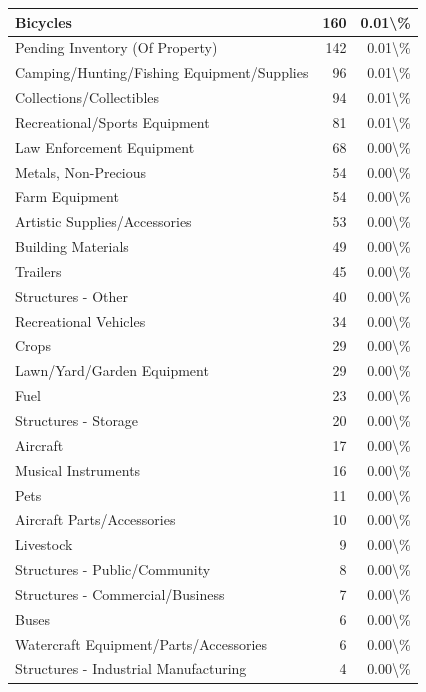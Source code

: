 \documentclass[
]{krantz}
\begin{document}
\begin{longtable}[t]{l|r|r}
\hline
Bicycles & 160 & 0.01\textbackslash{}\%\\
\hline
Pending Inventory (Of Property) & 142 & 0.01\textbackslash{}\%\\
\hline
Camping/Hunting/Fishing Equipment/Supplies & 96 & 0.01\textbackslash{}\%\\
\hline
Collections/Collectibles & 94 & 0.01\textbackslash{}\%\\
\hline
Recreational/Sports Equipment & 81 & 0.01\textbackslash{}\%\\
\hline
Law Enforcement Equipment & 68 & 0.00\textbackslash{}\%\\
\hline
Metals, Non-Precious & 54 & 0.00\textbackslash{}\%\\
\hline
Farm Equipment & 54 & 0.00\textbackslash{}\%\\
\hline
Artistic Supplies/Accessories & 53 & 0.00\textbackslash{}\%\\
\hline
Building Materials & 49 & 0.00\textbackslash{}\%\\
\hline
Trailers & 45 & 0.00\textbackslash{}\%\\
\hline
Structures - Other & 40 & 0.00\textbackslash{}\%\\
\hline
Recreational Vehicles & 34 & 0.00\textbackslash{}\%\\
\hline
Crops & 29 & 0.00\textbackslash{}\%\\
\hline
Lawn/Yard/Garden Equipment & 29 & 0.00\textbackslash{}\%\\
\hline
Fuel & 23 & 0.00\textbackslash{}\%\\
\hline
Structures - Storage & 20 & 0.00\textbackslash{}\%\\
\hline
Aircraft & 17 & 0.00\textbackslash{}\%\\
\hline
Musical Instruments & 16 & 0.00\textbackslash{}\%\\
\hline
Pets & 11 & 0.00\textbackslash{}\%\\
\hline
Aircraft Parts/Accessories & 10 & 0.00\textbackslash{}\%\\
\hline
Livestock & 9 & 0.00\textbackslash{}\%\\
\hline
Structures - Public/Community & 8 & 0.00\textbackslash{}\%\\
\hline
Structures - Commercial/Business & 7 & 0.00\textbackslash{}\%\\
\hline
Buses & 6 & 0.00\textbackslash{}\%\\
\hline
Watercraft Equipment/Parts/Accessories & 6 & 0.00\textbackslash{}\%\\
\hline
Structures - Industrial Manufacturing & 4 & 0.00\textbackslash{}\%\\

\end{longtable}
\end{document}
